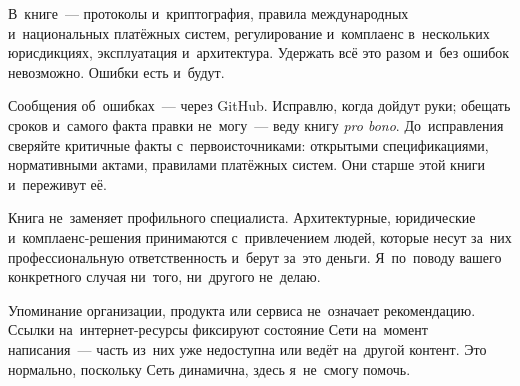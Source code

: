 

В~книге~--- протоколы и~криптография, правила международных и~национальных
платёжных систем, регулирование и~комплаенс в~нескольких юрисдикциях,
эксплуатация и~архитектура. Удержать всё это разом и~без ошибок
невозможно. Ошибки есть и~будут.

Сообщения об~ошибках~--- через GitHub. Исправлю, когда дойдут руки;
обещать сроков и~самого факта правки не~могу~--- веду книгу \textit{pro bono}.
До~исправления сверяйте критичные факты с~первоисточниками: открытыми
спецификациями, нормативными актами, правилами платёжных систем.
Они старше этой книги и~переживут её.

Книга не~заменяет профильного специалиста. Архитектурные, юридические
и~комплаенс-решения принимаются с~привлечением людей, которые несут
за~них профессиональную ответственность и~берут за~это деньги. Я~по~поводу
вашего конкретного случая ни~того, ни~другого не~делаю.

Упоминание организации, продукта или сервиса не~означает рекомендацию.
Ссылки на~интернет-ресурсы фиксируют состояние Сети на~момент написания~---
часть из~них уже недоступна или ведёт на~другой контент. Это нормально,
поскольку Сеть динамична, здесь я~не~смогу помочь.
